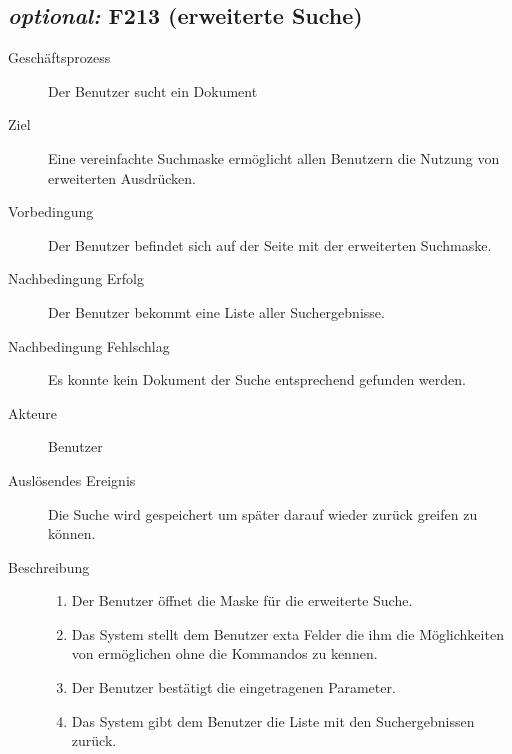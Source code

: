 \subsection{\emph{optional:} F213 (erweiterte Suche)}
\label{F:n00bSuche}
\begin{description}
  \item[Geschäftsprozess]Der Benutzer sucht ein Dokument
  \item[Ziel]Eine vereinfachte Suchmaske ermöglicht allen Benutzern die Nutzung von erweiterten Ausdrücken.
  \item[Vorbedingung]Der Benutzer befindet sich auf der Seite mit der erweiterten Suchmaske.
  \item[Nachbedingung Erfolg]Der Benutzer bekommt eine Liste aller Suchergebnisse.
  \item[Nachbedingung Fehlschlag]Es konnte kein Dokument der Suche entsprechend gefunden werden.
  \item[Akteure]Benutzer
  \item[Auslösendes Ereignis]Die Suche wird gespeichert um später darauf wieder zurück greifen zu können.
  \item[Beschreibung]\hfill
    \begin{enumerate}
      \item Der Benutzer öffnet die Maske für die erweiterte Suche.
      \item Das System stellt dem Benutzer exta Felder die ihm die Möglichkeiten von  ermöglichen ohne die Kommandos zu kennen.
      \item Der Benutzer bestätigt die eingetragenen Parameter.
      \item Das System gibt dem Benutzer die Liste mit den Suchergebnissen zurück.
    \end{enumerate}
\end{description}


